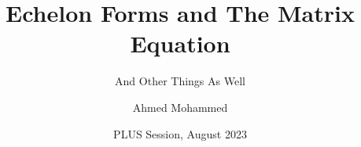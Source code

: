 \documentclass{beamer}
\title{Echelon Forms and The Matrix Equation}
\subtitle{And Other Things As Well}
\author{Ahmed Mohammed}
\date{PLUS Session, August 2023}
\institute{Georgia Institute of Technology}
\begin{document}
	\begin{frame}
		\maketitle
	\end{frame}
	
\end{document}

